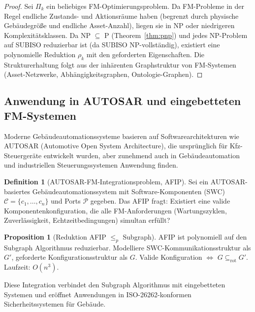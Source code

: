 ﻿\documentclass[a4paper,12pt]{article}
\theoremstyle{definition}
\newtheorem{definition}{Definition}[section]
\newtheorem{proposition}{Proposition}[section]
\begin{document}
\begin{proof}
Sei $\Pi_k$ ein beliebiges FM-Optimierungsproblem.
Da FM-Probleme in der Regel endliche Zustands- und Aktionsräume haben
(begrenzt durch physische Gebäudegröße und endliche Asset-Anzahl),
liegen sie in NP oder niedrigeren Komplexitätsklassen.
Da NP $\subseteq$ P (Theorem~\ref{thm:pnp}) und jedes NP-Problem auf SUBISO
reduzierbar ist (da SUBISO NP-vollständig), existiert eine polynomielle Reduktion
$\rho_k$ mit den geforderten Eigenschaften. Die Strukturerhaltung folgt aus der
inhärenten Graphstruktur von FM-Systemen (Asset-Netzwerke, Abhängigkeitsgraphen,
Ontologie-Graphen).
\end{proof}

\subsection{Anwendung in AUTOSAR und eingebetteten FM-Systemen}

Moderne Gebäudeautomationssysteme basieren auf Softwarearchitekturen wie
AUTOSAR (Automotive Open System Architecture), die ursprünglich für Kfz-Steuergeräte
entwickelt wurden, aber zunehmend auch in Gebäudeautomation und industriellen
Steuerungssystemen Anwendung finden.

\begin{definition}[AUTOSAR-FM-Integrationsproblem, AFIP]
\label{def:afip}
Sei ein AUTOSAR-basiertes Gebäudeautomationssystem mit Software-Komponenten
(SWC) $\mathcal{C} = \{c_1, \ldots, c_n\}$ und Ports $\mathcal{P}$ gegeben.
Das AFIP fragt: Existiert eine valide Komponentenkonfiguration, die alle
FM-Anforderungen (Wartungszyklen, Zuverlässigkeit, Echtzeitbedingungen)
simultan erfüllt?
\end{definition}

\begin{proposition}[Reduktion AFIP $\leq_p$ Subgraph]
AFIP ist polynomiell auf den Subgraph Algorithmus reduzierbar.
Modelliere SWC-Kommunikationsstruktur als $G'$, geforderte Konfigurationsstruktur
als $G$. Valide Konfiguration $\Leftrightarrow$ $G \subseteq_{\mathrm{rot}} G'$.
Laufzeit: $O(n^3)$.
\end{proposition}

Diese Integration verbindet den Subgraph Algorithmus mit eingebetteten Systemen
und eröffnet Anwendungen in ISO-26262-konformen Sicherheitssystemen für Gebäude.
\end{document}
